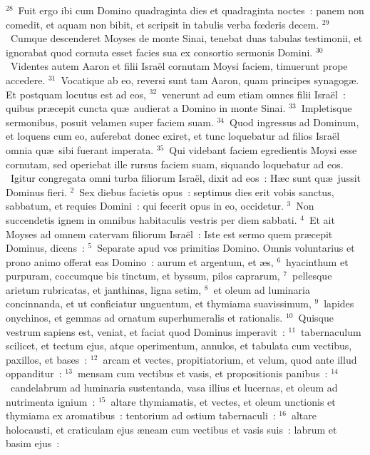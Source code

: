 ${}^{28}$~Fuit ergo ibi cum Domino quadraginta dies et quadraginta noctes~: panem non comedit, et aquam non bibit, et scripsit in tabulis verba fœderis decem.
${}^{29}$~Cumque descenderet Moyses de monte Sinai, tenebat duas tabulas testimonii, et ignorabat quod cornuta esset facies sua ex consortio sermonis Domini.
${}^{30}$~Videntes autem Aaron et filii Isra\"el cornutam Moysi faciem, timuerunt prope accedere.
${}^{31}$~Vocatique ab eo, reversi sunt tam Aaron, quam principes synagog\ae . Et postquam locutus est ad eos,
${}^{32}$~venerunt ad eum etiam omnes filii Isra\"el~: quibus pr\ae cepit cuncta qu\ae\ audierat a Domino in monte Sinai.
${}^{33}$~Impletisque sermonibus, posuit velamen super faciem suam.
${}^{34}$~Quod ingressus ad Dominum, et loquens cum eo, auferebat donec exiret, et tunc loquebatur ad filios Isra\"el omnia qu\ae\ sibi fuerant imperata.
${}^{35}$~Qui videbant faciem egredientis Moysi esse cornutam, sed operiebat ille rursus faciem suam, siquando loquebatur ad eos.
~\lettrine[lines=10,image=true,loversize=0.05,lraise=-0.03]{I}{}gitur congregata omni turba filiorum Isra\"el, dixit ad eos~: H\ae c sunt qu\ae\ jussit Dominus fieri.
${}^{2}$~Sex diebus facietis opus~: septimus dies erit vobis sanctus, sabbatum, et requies Domini~: qui fecerit opus in eo, occidetur.
${}^{3}$~Non succendetis ignem in omnibus habitaculis vestris per diem sabbati.
${}^{4}$~Et ait Moyses ad omnem catervam filiorum Isra\"el~: Iste est sermo quem pr\ae cepit Dominus, dicens~:
${}^{5}$~Separate apud vos primitias Domino. Omnis voluntarius et prono animo offerat eas Domino~: aurum et argentum, et \ae s,
${}^{6}$~hyacinthum et purpuram, coccumque bis tinctum, et byssum, pilos caprarum,
${}^{7}$~pellesque arietum rubricatas, et janthinas, ligna setim,
${}^{8}$~et oleum ad luminaria concinnanda, et ut conficiatur unguentum, et thymiama suavissimum,
${}^{9}$~lapides onychinos, et gemmas ad ornatum superhumeralis et rationalis.
${}^{10}$~Quisque vestrum sapiens est, veniat, et faciat quod Dominus imperavit~:
${}^{11}$~tabernaculum scilicet, et tectum ejus, atque operimentum, annulos, et tabulata cum vectibus, paxillos, et bases~:
${}^{12}$~arcam et vectes, propitiatorium, et velum, quod ante illud oppanditur~:
${}^{13}$~mensam cum vectibus et vasis, et propositionis panibus~:
${}^{14}$~candelabrum ad luminaria sustentanda, vasa illius et lucernas, et oleum ad nutrimenta ignium~:
${}^{15}$~altare thymiamatis, et vectes, et oleum unctionis et thymiama ex aromatibus~: tentorium ad ostium tabernaculi~:
${}^{16}$~altare holocausti, et craticulam ejus \ae neam cum vectibus et vasis suis~: labrum et basim ejus~:
